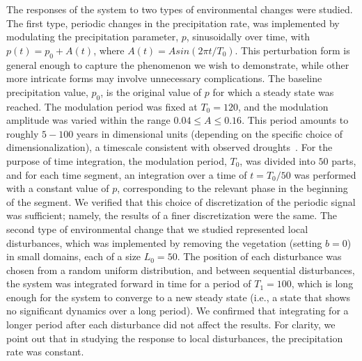 \documentclass[aps,prl,preprint,superscriptaddress,floatfix]{revtex4-1}
\begin{document}
The responses of the system to two types of environmental changes were studied. The first type, periodic changes in the precipitation rate, 
was implemented by modulating the precipitation parameter, $p$, sinusoidally over time, with $p(t) = p_0 + A\left(t\right)$, where $ A\left(t\right)= A sin (2\pi t/T_0)$.
This perturbation form is general enough to capture the phenomenon we wish to demonstrate, while other more intricate forms may involve unnecessary complications.
The baseline precipitation value, $p_0$, is the original value of $p$ for which a steady state was reached. 
The modulation period was fixed at $T_0= 120$, and the modulation amplitude was varied within the range $0.04\le A\le 0.16$.
This period amounts to roughly $5-100$ years in dimensional units (depending on the specific choice of dimensionalization), a timescale consistent with observed droughts~\cite{currie1981evidence}.
For the purpose of time integration, the modulation period, $T_0$, was divided into $50$ parts, and for each time segment, an integration over a time of $t=T_0/50$ was performed with a constant value of $p$, 
corresponding to the relevant phase in the beginning of the segment. 
We verified that this choice of discretization of the periodic signal was sufficient; namely, the results of a finer discretization were the same.
The second type of environmental change that we studied represented local disturbances, which was implemented by removing the vegetation (setting $b=0$) in small domains, each of a size $L_0=50$.
The position of each disturbance was chosen from a random uniform distribution, and between sequential disturbances, the system was integrated forward in time for a period of $T_1=100$, 
which is long enough for the system to converge to a new steady state (i.e., a state that shows no significant dynamics over a long period). 
We confirmed that integrating for a longer period after each disturbance did not affect the results.
For clarity, we point out that in studying the response to local disturbances, the precipitation rate was constant.

\end{document}
